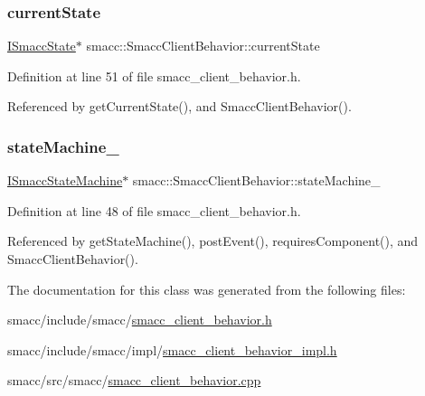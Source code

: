 \subsubsection{\texorpdfstring{current\+State}{currentState}}
{\footnotesize\ttfamily \hyperlink{classsmacc_1_1ISmaccState}{I\+Smacc\+State}$\ast$ smacc\+::\+Smacc\+Client\+Behavior\+::current\+State\hspace{0.3cm}{\ttfamily [private]}}



Definition at line 51 of file smacc\+\_\+client\+\_\+behavior.\+h.



Referenced by get\+Current\+State(), and Smacc\+Client\+Behavior().

\mbox{\label{classsmacc_1_1SmaccClientBehavior_a7950b5684d6de0a8e8959c0936ce9a19}} 
\subsubsection{\texorpdfstring{state\+Machine\+\_\+}{stateMachine\_}}
{\footnotesize\ttfamily \hyperlink{classsmacc_1_1ISmaccStateMachine}{I\+Smacc\+State\+Machine}$\ast$ smacc\+::\+Smacc\+Client\+Behavior\+::state\+Machine\+\_\+\hspace{0.3cm}{\ttfamily [private]}}



Definition at line 48 of file smacc\+\_\+client\+\_\+behavior.\+h.



Referenced by get\+State\+Machine(), post\+Event(), requires\+Component(), and Smacc\+Client\+Behavior().



The documentation for this class was generated from the following files\+:\begin{DoxyCompactItemize}
\item 
smacc/include/smacc/\hyperlink{smacc__client__behavior_8h}{smacc\+\_\+client\+\_\+behavior.\+h}\item 
smacc/include/smacc/impl/\hyperlink{smacc__client__behavior__impl_8h}{smacc\+\_\+client\+\_\+behavior\+\_\+impl.\+h}\item 
smacc/src/smacc/\hyperlink{smacc__client__behavior_8cpp}{smacc\+\_\+client\+\_\+behavior.\+cpp}\end{DoxyCompactItemize}
